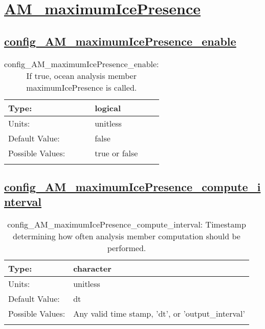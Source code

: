 \section[AM\_maximumIcePresence]{\hyperref[sec:nm_tab_AM_maximumIcePresence]{AM\_maximumIcePresence}}
\label{sec:nm_sec_AM_maximumIcePresence}
\subsection[config\_AM\_maximumIcePresence\_enable]{\hyperref[sec:nm_tab_AM_maximumIcePresence]{config\_AM\_maximumIcePresence\_enable}}
\label{subsec:nm_sec_config_AM_maximumIcePresence_enable}
\begin{center}
\begin{longtable}{| p{2.0in} || p{4.0in} |}
    \hline
    Type: & logical \\
    \hline
    Units: & \si{unitless} \\
    \hline
    Default Value: & false \\
    \hline
    Possible Values: & true or false \\
    \hline
    \caption{config\_AM\_maximumIcePresence\_enable: If true, ocean analysis member maximumIcePresence is called.}
\end{longtable}
\end{center}
\subsection[config\_AM\_maximumIcePresence\_compute\_interval]{\hyperref[sec:nm_tab_AM_maximumIcePresence]{config\_AM\_maximumIcePresence\_compute\_interval}}
\label{subsec:nm_sec_config_AM_maximumIcePresence_compute_interval}
\begin{center}
\begin{longtable}{| p{2.0in} || p{4.0in} |}
    \hline
    Type: & character \\
    \hline
    Units: & \si{unitless} \\
    \hline
    Default Value: & dt \\
    \hline
    Possible Values: & Any valid time stamp, 'dt', or 'output\_interval' \\
    \hline
    \caption{config\_AM\_maximumIcePresence\_compute\_interval: Timestamp determining how often analysis member computation should be performed.}
\end{longtable}
\end{center}
